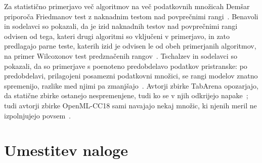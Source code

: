\documentclass[a4paper,12pt,openright]{book}
\begin{document}
Za statistično primerjavo več algoritmov na več podatkovnih množicah Demšar
priporoča Friedmanov test z naknadnim testom nad
povprečnimi rangi~\cite{demsar2006statistical}. Benavoli in sodelavci so pokazali, da je
izid naknadnih testov nad povprečnimi rangi odvisen od tega, kateri drugi
algoritmi so vključeni v primerjavo, in zato predlagajo parne teste, katerih
izid je odvisen le od obeh primerjanih algoritmov, na primer Wilcoxonov test
predznačenih rangov~\cite{benavoli2016should}. Tschalzev in sodelavci so pokazali, da so
primerjave s poenoteno predobdelavo podatkov pristranske: po predobdelavi,
prilagojeni posamezni podatkovni množici, se rangi modelov znatno spremenijo,
razlike med njimi pa zmanjšajo~\cite{tschalzev2024data}. Avtorji zbirke
TabArena opozarjajo, da statične zbirke ostanejo nespremenjene, tudi ko se v
njih odkrijejo napake~\cite{erickson2025tabarena}; tudi avtorji zbirke
OpenML-CC18 sami navajajo nekaj množic, ki njenih meril ne izpolnjujejo
povsem~\cite{bischl2021openml}.

\section{Umestitev naloge}
\label{sec:sor-umestitev}
\end{document}
